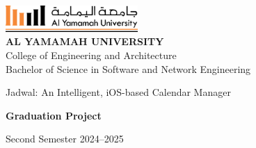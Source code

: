 \documentclass[12pt,a4paper,twoside]{report}
\begin{document}
\begin{singlespace}
    \begin{titlepage}
        \begin{center}
            \vspace*{1cm}
            \includegraphics[height=1cm]{images/yu-logo.png}\\[1cm]
            {\Large\bfseries AL YAMAMAH UNIVERSITY}\\[0.5cm]
            {\large College of Engineering and Architecture}\\[0.5cm]
            {\large Bachelor of Science in Software and Network Engineering}\\[2cm]
            {\Huge\bfseries
            \begin{spacing}{1}
                Jadwal: An Intelligent, iOS-based Calendar Manager
            \end{spacing}
            }
            \vspace{2cm}
            {\Large\bfseries Graduation Project}\\[2cm]
            \begin{center}
                \setlength{\fboxsep}{10pt}
                \setlength{\fboxrule}{1pt}
            \end{center}
            \vfill
            {\large Second Semester 2024--2025}
        \end{center}
    \end{titlepage}
\end{singlespace}
\end{document}
